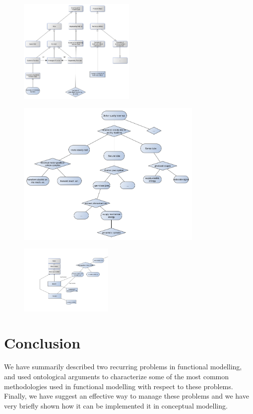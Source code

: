 \documentclass[
]{ceurart}
\begin{document}
\begin{figure}
  \centering
  \includegraphics[width=0.50\textwidth]{class-taxonomy.png}
  \caption{\label{fig:class-taxonomy}}
\end{figure}
\begin{figure}
  \centering
  \includegraphics[width=0.80\textwidth]{functional-decomposition.png}
  \caption{\label{fig:functional-decomposition}}
\end{figure}
\begin{figure}
  \centering
  \includegraphics[width=0.40\textwidth]{functional-decomposition-with-replacement.png}
  \caption{\label{fig:replacement}}
\end{figure}

\section{Conclusion}
We have summarily described two recurring problems in functional modelling, and used ontological arguments to characterize some of the most common methodologies used in functional modelling with respect to these problems.
Finally, we have suggest an effective way to manage these problems and we have very briefly shown how it can be implemented it in conceptual modelling.

\acknowledgments





\end{document}
